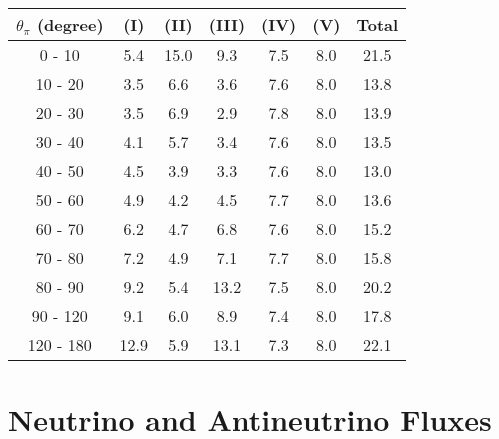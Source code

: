\documentclass[aps, prd, reprint,showpacs,  preprintnumbers,amsmath,amssymb,superscriptaddress, nofootinbib]{revtex4-1}
\makeatletter
\renewenvironment{table}
  {\def\@captype{table}}
  {}
\makeatother
\begin{document}

\vspace{1cm}


\begin{table}
\centering
\begin{tabular}{ccccccc}
\hline
$\theta_{\pi}$ (degree) & (I) & (II) & (III) & (IV) & (V) & Total \\
\hline
 0 - 10  & 5.4   &15.0   & 9.3   & 7.5   & 8.0   &21.5 \\
10 - 20  & 3.5   & 6.6   & 3.6   & 7.6   & 8.0   &13.8 \\
20 - 30  & 3.5   & 6.9   & 2.9   & 7.8   & 8.0   &13.9 \\
30 - 40  & 4.1   & 5.7   & 3.4   & 7.6   & 8.0   &13.5 \\
40 - 50  & 4.5   & 3.9   & 3.3   & 7.6   & 8.0   &13.0 \\
50 - 60  & 4.9   & 4.2   & 4.5   & 7.7   & 8.0   &13.6 \\
60 - 70  & 6.2   & 4.7   & 6.8   & 7.6   & 8.0   &15.2 \\
70 - 80  & 7.2   & 4.9   & 7.1   & 7.7   & 8.0   &15.8 \\
80 - 90  & 9.2   & 5.4   &13.2   & 7.5   & 8.0   &20.2 \\
90 - 120  & 9.1  & 6.0   & 8.9   & 7.4   & 8.0   &17.8 \\
120 - 180  &12.9 & 5.9   &13.1   & 7.3   & 8.0   &22.1 \\
\hline
\hline
\end{tabular}
\caption{Fractional systematic uncertainties (in percent) on $d\sigma/d\theta_\pi$.}
\label{tb:pi0_theta_err}
\end{table}


\vspace{1cm}

\section{Neutrino and Antineutrino Fluxes}
\end{document}
